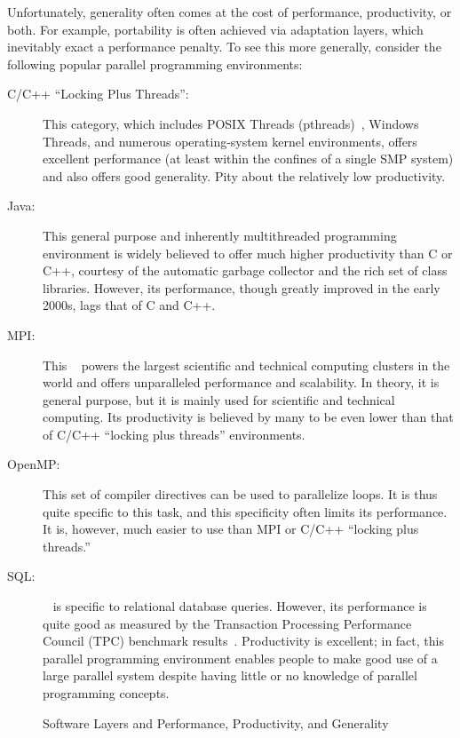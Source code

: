 Unfortunately, generality often comes at the cost of performance,
productivity, or both.
For example, portability is often achieved via adaptation layers,
which inevitably exact a performance penalty.
To see this more generally, consider the following popular parallel
programming environments:

\begin{description}
\item[C/C++ ``Locking Plus Threads'':] This category, which includes
	POSIX Threads (pthreads)~\cite{OpenGroup1997pthreads},
	Windows Threads, and numerous
	operating-system kernel environments, offers excellent performance
	(at least within the confines of a single SMP system)
	and also offers good generality.
	Pity about the relatively low productivity.
\item[Java:] This general purpose and inherently multithreaded
	programming environment	is widely believed to offer much higher
	productivity than C or C++, courtesy of the automatic garbage collector
	and the rich set of class libraries.
	However, its performance, though greatly improved in the early
	2000s, lags that of C and C++.
\item[MPI:] This ~\cite{MPIForum2008} powers
	the largest scientific and technical computing clusters in
	the world and offers unparalleled performance and scalability.
	In theory, it is general purpose, but it is mainly used
	for scientific and technical computing.
	Its productivity is believed by many to be even lower than that
	of C/C++ ``locking plus threads'' environments.
\item[OpenMP:] This set of compiler directives can be used
	to parallelize loops.  It is thus quite specific to this
	task, and this specificity often limits its performance.
	It is, however, much easier to use than MPI or C/C++
	``locking plus threads.''
\item[SQL:] ~\cite{DIS9075SQL92} is
	specific to relational database queries.
	However, its performance is quite good as measured by the
	Transaction Processing Performance Council (TPC)
	benchmark results~\cite{TPC}.
	Productivity is excellent; in fact, this parallel programming
	environment enables people to make good use of a large parallel
	system despite having little or no knowledge of parallel
	programming concepts.
\end{description}

\begin{figure}
\centering
{}
\caption{Software Layers and Performance, Productivity, and Generality}
\label{fig:intro:Software Layers and Performance, Productivity, and Generality}
\end{figure}

